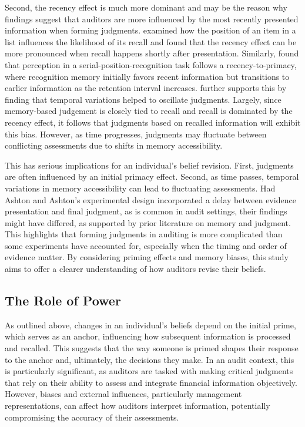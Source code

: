 \documentclass[12pt,english]{article}
\begin{document}
Second, the recency effect is much more dominant and may be the reason why \citet{ashton1988} findings suggest that auditors are more influenced by the most recently presented information when forming judgments. \citet{murdock1962} examined how the position of an item in a list influences the likelihood of its recall and found that the recency effect can be more pronounced when recall happens shortly after presentation. Similarly, \citet{daniel2018} found that perception in a serial-position-recognition task follows a recency-to-primacy, where recognition memory initially favors recent information but transitions to earlier information as the retention interval increases. \citet{yuan1997} further supports this by finding that temporal variations helped to oscillate judgments. Largely, since memory-based judgement is closely tied to recall \citep{begg1989} and recall is dominated by the recency effect, it follows that judgments based on recalled information will exhibit this bias. However, as time progresses, judgments may fluctuate between conflicting assessments due to shifts in memory accessibility.

This has serious implications for an individual’s belief revision. First, judgments are often influenced by an initial primacy effect. Second, as time passes, temporal variations in memory accessibility can lead to fluctuating assessments. Had Ashton and Ashton’s experimental design incorporated a delay between evidence presentation and final judgment, as is common in audit settings, their findings might have differed, as supported by prior literature on memory and judgment. This highlights that forming judgments in auditing is more complicated than some experiments have accounted for, especially when the timing and order of evidence matter. By considering priming effects and memory biases, this study aims to offer a clearer understanding of how auditors revise their beliefs.

\subsection{The Role of Power}
As outlined above, changes in an individual's beliefs depend on the initial prime, which serves as an anchor, influencing how subsequent information is processed and recalled. This suggests that the way someone is primed shapes their response to the anchor and, ultimately, the decisions they make. In an audit context, this is particularly significant, as auditors are tasked with making critical judgments that rely on their ability to assess and integrate financial information objectively. However, biases and external influences, particularly management representations, can affect how auditors interpret information, potentially compromising the accuracy of their assessments.
\end{document}
